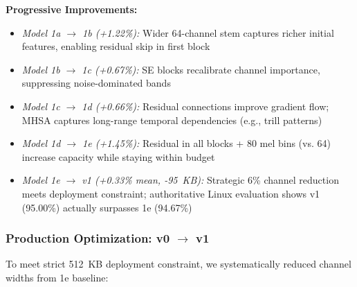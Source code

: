 \documentclass[conference]{IEEEtran}
\begin{document}
\noindent\textbf{Progressive Improvements:}
\begin{itemize}
    \item \textit{Model 1a $\to$ 1b (+1.22\%):} Wider 64-channel stem captures richer initial features, enabling residual skip in first block
    \item \textit{Model 1b $\to$ 1c (+0.67\%):} SE blocks recalibrate channel importance, suppressing noise-dominated bands
    \item \textit{Model 1c $\to$ 1d (+0.66\%):} Residual connections improve gradient flow; MHSA captures long-range temporal dependencies (e.g., trill patterns)
    \item \textit{Model 1d $\to$ 1e (+1.45\%):} Residual in all blocks + 80 mel bins (vs. 64) increase capacity while staying within budget
    \item \textit{Model 1e $\to$ v1 (+0.33\% mean, -95~KB):} Strategic 6\% channel reduction meets deployment constraint; authoritative Linux evaluation shows v1 (95.00\%) actually surpasses 1e (94.67\%)
\end{itemize}

\subsubsection{Production Optimization: v0 $\to$ v1}

To meet strict 512~KB deployment constraint, we systematically reduced channel widths from 1e baseline:

\begin{table}[h]
\centering
\caption{MynaNet Production Variants (80:10:10 split, Mixup 0.2)}
\label{tab:production_variants}
\end{table}
\end{document}
